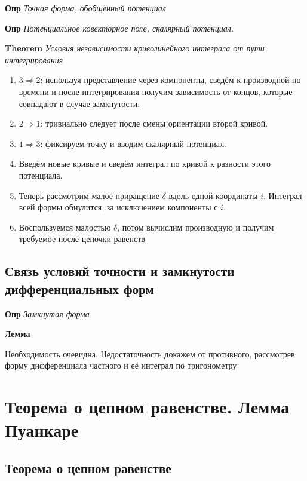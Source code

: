 \documentclass[a4paper, 14pt]{article}
\begin{document}
    \textbf{Опр} \textit{Точная форма, обобщённый потенциал}
    
    \textbf{Опр} \textit{Потенциальное ковекторное поле, скалярный потенциал.}
    
    \textbf{Theorem} \textit{Условия независимости криволинейного интеграла от пути интегрирования}
    
    \begin{enumerate}
        \item $3 \Rightarrow 2$: используя представление через компоненты, сведём к производной по времени и после
        интегрирования получим зависимость от концов, которые совпадают в случае замкнутости.
        \item $2 \Rightarrow 1$: тривиально следует после смены ориентации второй кривой.
        \item $1 \Rightarrow 3$: фиксируем точку и вводим скалярный потенциал.
        \item Введём новые кривые и сведём интеграл по кривой к разности этого потенциала.
        \item Теперь рассмотрим малое приращение $\delta$ вдоль одной координаты $i$.
        Интеграл всей формы обнулится, за исключением компоненты с $i$.
        \item Воспользуемся малостью $\delta$, потом вычислим производную и получим требуемое после цепочки равенств
    \end{enumerate}
    
    \subsection{Связь условий точности и замкнутости дифференциальных форм}
    
    \textbf{Опр} \textit{Замкнутая форма}
    
    \textbf{Лемма}
    
    Необходимость очевидна.
    Недостаточность докажем от противного, рассмотрев форму дифференциала частного и её интеграл по тригонометру
    
    \section{Теорема о цепном равенстве.
    Лемма Пуанкаре}
    
    \subsection{Теорема о цепном равенстве}
    
\end{document}
